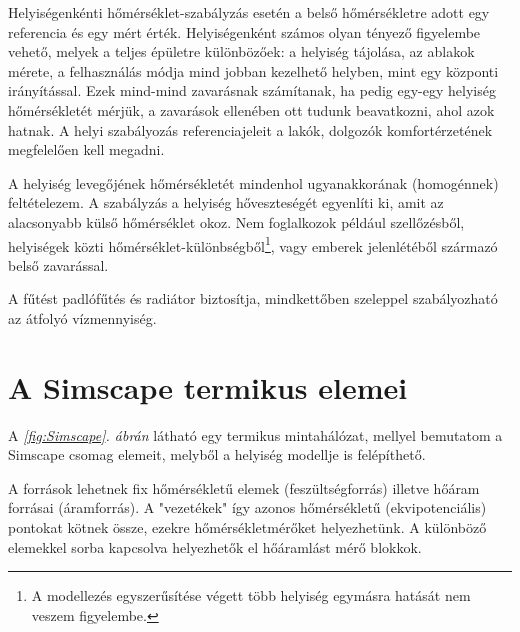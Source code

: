 



%
%
%
%


Helyiségenkénti hőmérséklet-szabályzás esetén a belső hőmérsékletre adott egy referencia és egy mért érték.
Helyiségenként számos olyan tényező figyelembe vehető, melyek a teljes épületre különbözőek: a helyiség tájolása, az ablakok mérete, a felhasználás módja mind jobban kezelhető helyben, mint egy központi irányítással. Ezek mind-mind zavarásnak számítanak, ha pedig egy-egy helyiség hőmérsékletét mérjük, a zavarások ellenében ott tudunk beavatkozni, ahol azok hatnak. A helyi szabályozás referenciajeleit a lakók, dolgozók komfortérzetének megfelelően kell megadni.

A helyiség levegőjének hőmérsékletét mindenhol ugyanakkorának (homogénnek) feltételezem. A szabályzás a helyiség hőveszteségét egyenlíti ki, amit az alacsonyabb külső hőmérséklet okoz. Nem foglalkozok például szellőzésből, helyiségek közti hő\-mér\-sék\-let-különbségből\footnote{A modellezés egyszerűsítése végett több helyiség egymásra hatását nem veszem figyelembe.}, vagy emberek jelenlétéből származó belső zavarással.

A fűtést padlófűtés és radiátor biztosítja, mindkettőben szeleppel szabályozható az átfolyó vízmennyiség.

\section{A Simscape termikus elemei}

A \textit{\ref{fig:Simscape}. ábrán} látható egy termikus mintahálózat, mellyel bemutatom a Simscape csomag elemeit, melyből a helyiség modellje is felépíthető.

A források lehetnek fix hőmérsékletű elemek (feszültségforrás) illetve hőáram forrásai (áramforrás).
A "vezetékek" így azonos hőmérsékletű (ekvipotenciális) pontokat kötnek össze, ezekre hőmérsékletmérőket helyezhetünk. A különböző elemekkel sorba kapcsolva helyezhetők el hőáramlást mérő blokkok.

